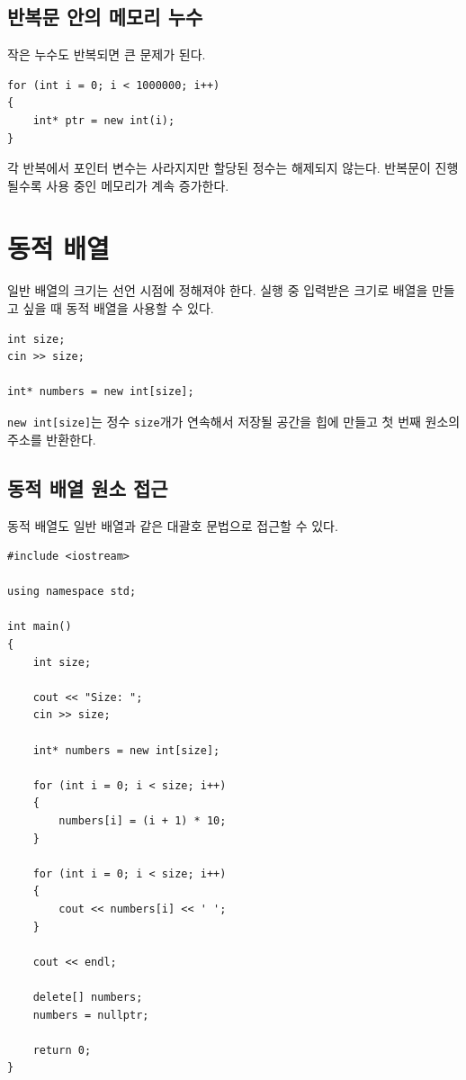 \documentclass[11pt,a4paper]{article}
\begin{document}
\subsection{반복문 안의 메모리 누수}

작은 누수도 반복되면 큰 문제가 된다.

\begin{lstlisting}
for (int i = 0; i < 1000000; i++)
{
    int* ptr = new int(i);
}
\end{lstlisting}

각 반복에서 포인터 변수는 사라지지만 할당된 정수는 해제되지 않는다.
반복문이 진행될수록 사용 중인 메모리가 계속 증가한다.

\section{동적 배열}

일반 배열의 크기는 선언 시점에 정해져야 한다.
실행 중 입력받은 크기로 배열을 만들고 싶을 때 동적 배열을 사용할 수 있다.

\begin{lstlisting}
int size;
cin >> size;

int* numbers = new int[size];
\end{lstlisting}

\texttt{new int[size]}는 정수 \texttt{size}개가 연속해서 저장될 공간을 힙에 만들고 첫 번째 원소의 주소를 반환한다.

\subsection{동적 배열 원소 접근}

동적 배열도 일반 배열과 같은 대괄호 문법으로 접근할 수 있다.

\begin{lstlisting}
#include <iostream>

using namespace std;

int main()
{
    int size;

    cout << "Size: ";
    cin >> size;

    int* numbers = new int[size];

    for (int i = 0; i < size; i++)
    {
        numbers[i] = (i + 1) * 10;
    }

    for (int i = 0; i < size; i++)
    {
        cout << numbers[i] << ' ';
    }

    cout << endl;

    delete[] numbers;
    numbers = nullptr;

    return 0;
}
\end{lstlisting}
\end{document}
